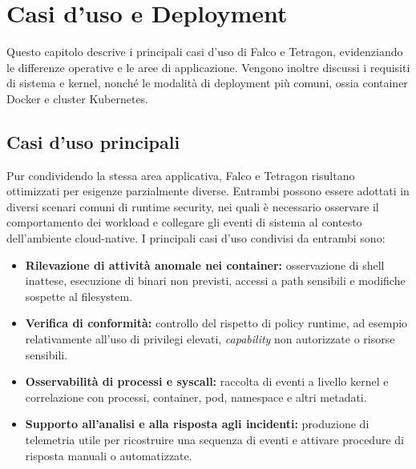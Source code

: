 \documentclass[12pt,a4paper,openright,twoside]{book}
\begin{document}

\chapter{Casi d'uso e Deployment}
\label{chap:use-cases-deployment}

Questo capitolo descrive i principali casi d'uso di Falco e Tetragon, evidenziando le differenze operative e le aree di applicazione. Vengono inoltre discussi i requisiti di sistema e kernel, nonché le modalità di deployment più comuni, ossia container Docker e cluster Kubernetes.

\section{Casi d'uso principali}
\label{sec:use-cases}

Pur condividendo la stessa area applicativa, Falco e Tetragon risultano ottimizzati per esigenze parzialmente diverse. Entrambi possono essere adottati in diversi scenari comuni di runtime security, nei quali è necessario osservare il comportamento dei workload e collegare gli eventi di sistema al contesto dell'ambiente cloud-native. I principali casi d'uso condivisi da entrambi sono:
\begin{itemize}
    \item \textbf{Rilevazione di attività anomale nei container:} osservazione di shell inattese, esecuzione di binari non previsti, accessi a path sensibili e modifiche sospette al filesystem.
    \item \textbf{Verifica di conformità:} controllo del rispetto di policy runtime, ad esempio relativamente all'uso di privilegi elevati, \textit{capability} non autorizzate o risorse sensibili.
    \item \textbf{Osservabilità di processi e syscall:} raccolta di eventi a livello kernel e correlazione con processi, container, pod, namespace e altri metadati.
    \item \textbf{Supporto all'analisi e alla risposta agli incidenti:} produzione di telemetria utile per ricostruire una sequenza di eventi e attivare procedure di risposta manuali o automatizzate.
\end{itemize}
\end{document}
